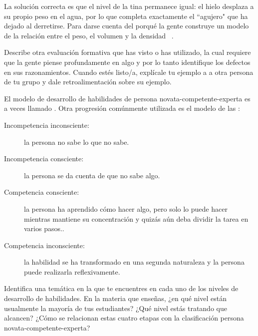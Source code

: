 
La solución correcta es que el nivel de la tina permanece igual:
el hielo desplaza a su propio peso en el agua,
por lo que completa exactamente el ``agujero" que ha dejado al derretirse.
Para darse cuenta del porqué la gente construye un modelo de la relación entre el peso, el volumen y la densidad ~\cite{Epst2002}.

Describe otra evaluación formativa que has visto o has utilizado,
la cual requiere que la gente piense profundamente en algo
y por lo tanto identifique los defectos en sus razonamientos.
Cuando estés listo/a,
explícale tu ejemplo a a otra persona de tu grupo
y dale retroalimentación sobre su ejemplo.

El modelo de desarrollo de habilidades de persona novata-competente-experta
es a veces llamado
.
Otra progresión comúnmente utilizada es el modelo de las :

\begin{description}

\item[Incompetencia inconsciente:]
  la persona no sabe lo que no sabe.

\item[Incompetencia consciente:]
  la persona se da cuenta de que no sabe algo.

\item[Competencia consciente:]
la persona ha aprendido cómo hacer algo,
pero solo lo puede hacer mientras mantiene su concentración
y quizás aún deba dividir la tarea en varios pasos..

\item[Competencia inconsciente:]
  la habilidad se ha transformado en una segunda naturaleza
y la persona puede realizarla reflexivamente.

\end{description}

Identifica una temática en la que te encuentres en cada uno de los niveles de desarrollo de habilidades.
En la materia que enseñas, ¿en qué nivel están usualmente la mayoría de tus estudiantes?
¿Qué nivel estás tratando que alcancen?
¿Cómo se relacionan estas cuatro etapas con la clasificación persona novata-competente-experta?


